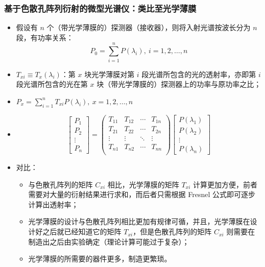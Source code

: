 \begin{frame}[c]
    \frametitle{基于色散孔阵列衍射的微型光谱仪：类比至光学薄膜}
    \begin{itemize}
        \item 假设有 $n$ 个（带光学薄膜的）探测器（接收器），则将入射光谱按波长分为 $n$ 段，有功率关系：\[P_0=\sum^{n}_{i=1}P(\lambda_i),\ i=1,2,\dots,n\]
        \item $T_{xi}\equiv T_{x}(\lambda_i)$：第 $x$ 块光学薄膜对第 $i$ 段光谱所包含的光的透射率，亦即第 $i$ 段光谱所包含的光在第 $x$ 块（带光学薄膜的）探测器上的功率与原功率之比；
        \item $P_x=\sum^{n}_{i=1}T_{xi}P(\lambda_i),\ x=1,2,\dots,n$
        \item \[\begin{bmatrix}
                      P_1 \\P_2\\ \vdots \\ P_n
                  \end{bmatrix}=\begin{pmatrix}
                      T_{11} & T_{12} & \cdots & T_{1n} \\
                      T_{21} & T_{22} & \cdots & T_{2n} \\
                      \vdots & \vdots & \ddots & \vdots \\
                      T_{n1} & T_{n2} & \cdots & T_{nn} \\
                  \end{pmatrix}\begin{bmatrix}
                      P(\lambda_1) \\P(\lambda_2)\\ \vdots \\ P(\lambda_n)
                  \end{bmatrix}\]
        \item 对比：\begin{itemize}
                  \item 与色散孔阵列的矩阵 $C_{xi}$ 相比，光学薄膜的矩阵 $T_{xi}$ 计算更加方便，前者需要对大量的衍射结果进行求和，而后者只需根据 Fresnel 公式即可逐步计算出透射率；
                  \item 光学薄膜的设计与色散孔阵列相比更加有规律可循，并且，光学薄膜在设计好之后就已经知道它的矩阵 $T_{xi}$，但是色散孔阵列的矩阵 $C_{xi}$ 则需要在制造出之后由实验确定（理论计算可能过于复杂）；
                  \item 光学薄膜的所需要的器件更多，制造更繁琐。
              \end{itemize}
    \end{itemize}
\end{frame}


